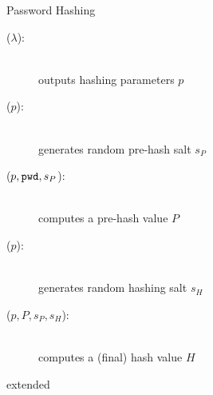 \documentclass[notes,xcolor=dvipsnames]{beamer}
\begin{document}
\begin{frame}{Password Hashing}
  \begin{center}
  \end{center}
  \begin{description}
    \item[\PSetup($\lambda$):] \hfill\\ outputs hashing parameters $p$
    \item[\PPHSalt($p$):] \hfill\\	generates random pre-hash salt $s_P$
    \item[\PPreHash($p, \mathtt{pwd}, s_P$):] \hfill\\	computes a pre-hash value $P$
    \item[\PHSalt($p$):] \hfill\\ generates random hashing salt $s_H$
    \item[\PHash($p, P, s_P, s_H$):]	\hfill\\ computes a (final) hash value $H$
  \end{description}
  extended \cite{BenhamoudaP13}
\end{frame}
\end{document}
